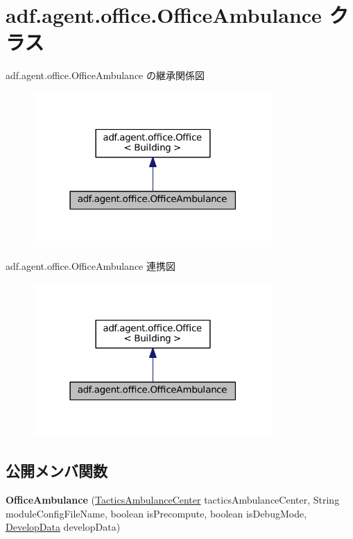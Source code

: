 \hypertarget{classadf_1_1agent_1_1office_1_1OfficeAmbulance}{}\section{adf.\+agent.\+office.\+Office\+Ambulance クラス}
\label{classadf_1_1agent_1_1office_1_1OfficeAmbulance}


adf.\+agent.\+office.\+Office\+Ambulance の継承関係図
\nopagebreak
\begin{figure}[H]
\begin{center}
\leavevmode
\includegraphics[width=259pt]{classadf_1_1agent_1_1office_1_1OfficeAmbulance__inherit__graph}
\end{center}
\end{figure}


adf.\+agent.\+office.\+Office\+Ambulance 連携図
\nopagebreak
\begin{figure}[H]
\begin{center}
\leavevmode
\includegraphics[width=259pt]{classadf_1_1agent_1_1office_1_1OfficeAmbulance__coll__graph}
\end{center}
\end{figure}
\subsection*{公開メンバ関数}
\begin{DoxyCompactItemize}
\item 
\hypertarget{classadf_1_1agent_1_1office_1_1OfficeAmbulance_a1889be46f63d5cbe6eb76cd711f9dee4}{}\label{classadf_1_1agent_1_1office_1_1OfficeAmbulance_a1889be46f63d5cbe6eb76cd711f9dee4} 
{\bfseries Office\+Ambulance} (\hyperlink{classadf_1_1component_1_1tactics_1_1center_1_1TacticsAmbulanceCenter}{Tactics\+Ambulance\+Center} tactics\+Ambulance\+Center, String module\+Config\+File\+Name, boolean is\+Precompute, boolean is\+Debug\+Mode, \hyperlink{classadf_1_1agent_1_1develop_1_1DevelopData}{Develop\+Data} develop\+Data)
\end{DoxyCompactItemize}
